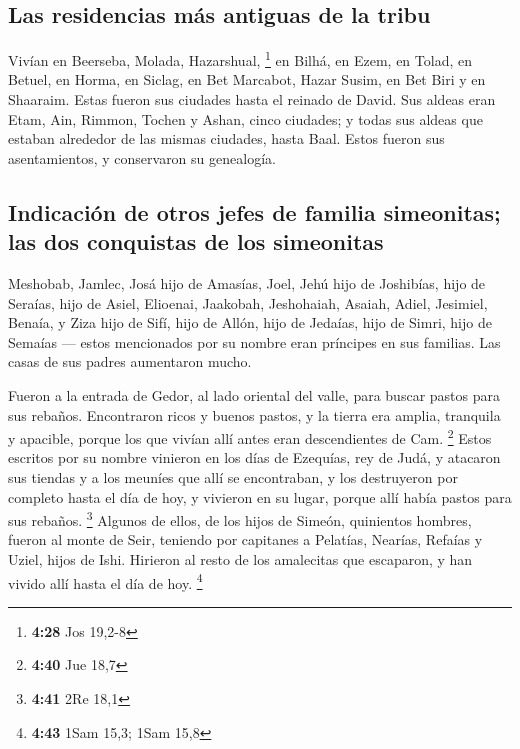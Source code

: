 \hypertarget{las-residencias-muxe1s-antiguas-de-la-tribu}{%
\subsection{Las residencias más antiguas de la
tribu}\label{las-residencias-muxe1s-antiguas-de-la-tribu}}

 Vivían en Beerseba, Molada, Hazarshual, \footnote{\textbf{4:28}
  Jos 19,2-8}  en Bilhá, en Ezem, en Tolad,
 en Betuel, en Horma, en Siclag,  en Bet
Marcabot, Hazar Susim, en Bet Biri y en Shaaraim. Estas fueron sus
ciudades hasta el reinado de David.  Sus aldeas eran
Etam, Ain, Rimmon, Tochen y Ashan, cinco ciudades;  y
todas sus aldeas que estaban alrededor de las mismas ciudades, hasta
Baal. Estos fueron sus asentamientos, y conservaron su genealogía.

\hypertarget{indicaciuxf3n-de-otros-jefes-de-familia-simeonitas-las-dos-conquistas-de-los-simeonitas}{%
\subsection{Indicación de otros jefes de familia simeonitas; las dos
conquistas de los
simeonitas}\label{indicaciuxf3n-de-otros-jefes-de-familia-simeonitas-las-dos-conquistas-de-los-simeonitas}}

 Meshobab, Jamlec, Josá hijo de Amasías, 
Joel, Jehú hijo de Joshibías, hijo de Seraías, hijo de Asiel,
 Elioenai, Jaakobah, Jeshohaiah, Asaiah, Adiel, Jesimiel,
Benaía,  y Ziza hijo de Sifí, hijo de Allón, hijo de
Jedaías, hijo de Simri, hijo de Semaías ---  estos
mencionados por su nombre eran príncipes en sus familias. Las casas de
sus padres aumentaron mucho.

 Fueron a la entrada de Gedor, al lado oriental del
valle, para buscar pastos para sus rebaños.  Encontraron
ricos y buenos pastos, y la tierra era amplia, tranquila y apacible,
porque los que vivían allí antes eran descendientes de Cam. \footnote{\textbf{4:40}
  Jue 18,7}  Estos escritos por su nombre vinieron en los
días de Ezequías, rey de Judá, y atacaron sus tiendas y a los meuníes
que allí se encontraban, y los destruyeron por completo hasta el día de
hoy, y vivieron en su lugar, porque allí había pastos para sus rebaños.
\footnote{\textbf{4:41} 2Re 18,1}  Algunos de ellos, de
los hijos de Simeón, quinientos hombres, fueron al monte de Seir,
teniendo por capitanes a Pelatías, Nearías, Refaías y Uziel, hijos de
Ishi.  Hirieron al resto de los amalecitas que escaparon,
y han vivido allí hasta el día de hoy. \footnote{\textbf{4:43} 1Sam
  15,3; 1Sam 15,8}

